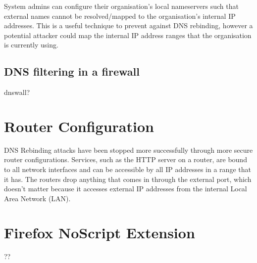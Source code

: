 System admins can configure their organisation's local nameservers
such that external names cannot be resolved/mapped to the organisation's
internal IP addresses. This is a useful technique to prevent against
DNS rebinding, however a potential attacker could map the internal
IP address ranges that the organisation is currently using.

\subsection{DNS filtering in a firewall}

dnswall?

\section{Router Configuration}

DNS Rebinding attacks have been stopped more successfully through
more secure router configurations. Services, such as the HTTP server
on a router, are bound to all network interfaces and can be accessible
by all IP addresses in a range that it has. The routers drop anything
that comes in through the external port, which doesn't matter because
it accesses external IP addresses from the internal Local Area Network (LAN).

\section{Firefox NoScript Extension}

??
